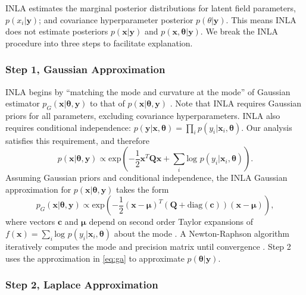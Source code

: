 INLA estimates the marginal posterior distributions for latent field parameters, $p(x_{i}|\pmb{y})$; and covariance hyperparameter posterior $p(\theta|\pmb{y})$. This means INLA does not estimate posteriors $p(\pmb{x}|\pmb{y})$ and $p(\pmb{x},\pmb{\theta}|\pmb{y})$. We break the INLA procedure into three steps to facilitate explanation.

\subsubsection{Step 1, Gaussian Approximation} %

INLA begins by ``matching the mode and curvature at the mode'' of Gaussian estimator $p_{G}(\pmb{x}|\pmb{\theta}, \pmb{y})$ to that of $p(\pmb{x}|\pmb{\theta}, \pmb{y})$ \citep{Rue2005}. Note that INLA requires Gaussian priors for all parameters, excluding covariance hyperparameters. INLA also requires conditional independence: $p(\pmb{y}|\pmb{x}, \pmb{\theta}) = \prod_{i} p(y_{i}|\pmb{x}_{i},\pmb{\theta})$. Our analysis satisfies this requirement, and therefore $$p(\pmb{x}|\pmb{\theta},\pmb{y}) \propto \text{exp}\left(-\frac{1}{2}\pmb{x}^{T}\pmb{Q x} + \sum_{i} \text{log }p(y_{i}|\pmb{x}_{i},\pmb{\theta}) \right).$$ Assuming Gaussian priors and conditional independence, the INLA Gaussian approximation for $p(\pmb{x}|\pmb{\theta}, \pmb{y})$ takes the form
\begin{equation} \label{eq:ga}
p_{G}(\pmb{x}|\pmb{\theta},\pmb{y}) \propto \text{exp} \left( -\frac{1}{2}(\pmb{x-\mu})^{T} (\pmb{Q} + \text{diag}(\pmb{c}) ) (\pmb{x - \mu}) \right),
\end{equation}
where vectors $\pmb{c}$ and $\pmb{\mu}$ depend on second order Taylor expansions of $f(\pmb{x}) = \sum_{i} \text{log }p(y_{i}|\pmb{x}_{i},\pmb{\theta})$ about the mode \citep{Lindstrom2014}. A Newton-Raphson algorithm iteratively computes the mode and precision matrix until convergence \citep{Rue2009}. Step 2 uses the approximation in \ref{eq:ga} to approximate $p(\pmb{\theta}|\pmb{y})$.

\subsubsection{Step 2, Laplace Approximation}  %

